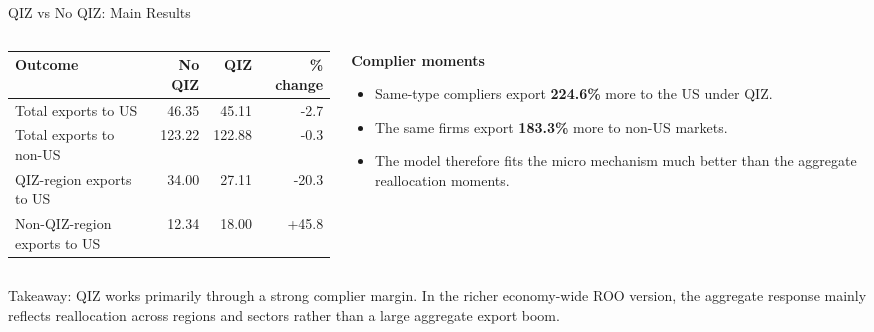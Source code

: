 \begin{frame}[t]{QIZ vs No QIZ: Main Results}
\small
\begin{columns}[T,onlytextwidth]
\begin{column}{0.62\textwidth}
\centering
\renewcommand{\arraystretch}{1.12}
\begin{tabular}{lrrr}
\hline
\textbf{Outcome} & \textbf{No QIZ} & \textbf{QIZ} & \textbf{\% change} \\
\hline
Total exports to US & 46.35 & 45.11 & -2.7 \\
Total exports to non-US & 123.22 & 122.88 & -0.3 \\
QIZ-region exports to US & 34.00 & 27.11 & -20.3 \\
Non-QIZ-region exports to US & 12.34 & 18.00 & +45.8 \\
\hline
\end{tabular}
\end{column}
\begin{column}{0.34\textwidth}
\textbf{Complier moments}
\begin{itemize}
    \item Same-type compliers export \textbf{224.6\%} more to the US under QIZ.
    \item The same firms export \textbf{183.3\%} more to non-US markets.
    \item The model therefore fits the micro mechanism much better than the aggregate reallocation moments.
\end{itemize}
\end{column}
\end{columns}

\vspace{0.4em}
\begin{columns}[T,onlytextwidth]
\begin{column}{\textwidth}
\footnotesize
Takeaway: QIZ works primarily through a strong complier margin. In the richer economy-wide ROO version, the aggregate response mainly reflects reallocation across regions and sectors rather than a large aggregate export boom.
\end{column}
\end{columns}
\end{frame}

